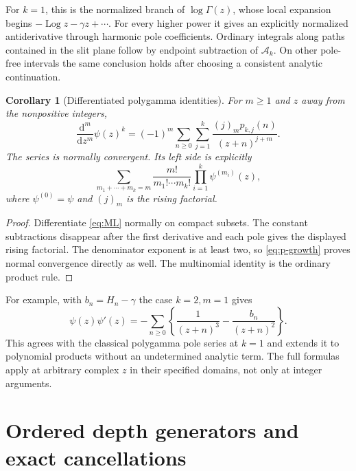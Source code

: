 \documentclass[11pt,a4paper]{article}
\numberwithin{equation}{section}
\newtheorem{corollary}[theorem]{Corollary}
\theoremstyle{definition}
\theoremstyle{remark}
\newcommand{\dd}{\mathrm d}
\newcommand{\Log}{\operatorname{Log}}
\begin{document}
For $k=1$, this is the normalized branch of $\log\Gamma(z)$,
whose local expansion begins $-\Log z-\gamma z+\cdots$.
For every higher power it gives an explicitly normalized antiderivative
through harmonic pole coefficients.  Ordinary integrals along paths
contained in the slit plane follow by endpoint subtraction of
$\mathcal A_k$.  On other pole-free intervals the same conclusion
holds after choosing a consistent analytic continuation.

\begin{corollary}[Differentiated polygamma identities]
\label{cor:derivatives}
For $m\ge1$ and $z$ away from the nonpositive integers,
\begin{equation}
 \frac{\dd^m}{\dd z^m}\psi(z)^k
  =(-1)^m\sum_{n\ge0}\sum_{j=1}^k
              \frac{(j)_m p_{k,j}(n)}{(z+n)^{j+m}}.
 \label{eq:all-derivatives}
\end{equation}
The series is normally convergent.  Its left side is explicitly
\begin{equation}
 \sum_{m_1+\cdots+m_k=m}
          \frac{m!}{m_1!\cdots m_k!}
                         \prod_{i=1}^k\psi^{(m_i)}(z),
 \label{eq:polygamma-multinomial}
\end{equation}
where $\psi^{(0)}=\psi$ and $(j)_m$ is the rising factorial.
\end{corollary}

\begin{proof}
Differentiate \eqref{eq:ML} normally on compact subsets.  The constant
subtractions disappear after the first derivative and each pole gives
the displayed rising factorial.  The denominator exponent is at least
two, so \eqref{eq:p-growth} proves normal convergence directly as well.
The multinomial identity is the ordinary product rule.
\end{proof}

For example, with $b_n=H_n-\gamma$ the case $k=2,m=1$ gives
\[
 \psi(z)\psi'(z)
     =-\sum_{n\ge0}\left\{\frac1{(z+n)^3}
                             -\frac{b_n}{(z+n)^2}\right\}.
\]
This agrees with the classical polygamma pole series at $k=1$ and
extends it to polynomial products without an undetermined analytic
term.  The full formulas apply at arbitrary complex $z$ in their
specified domains, not only at integer arguments.

\section{Ordered depth generators and exact cancellations}
\label{sec:ordered}
\end{document}
